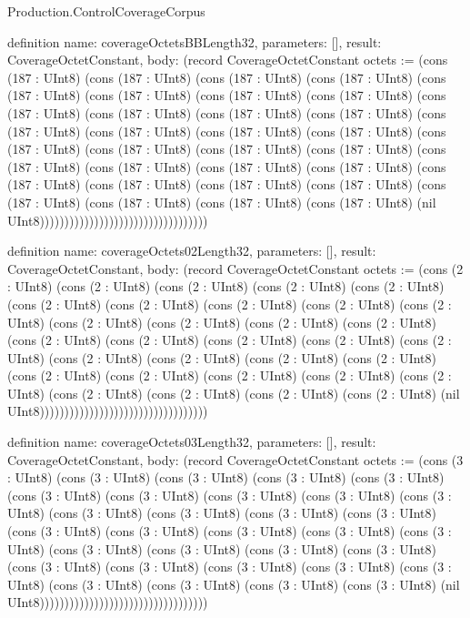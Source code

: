 \begin{lexlean}{Production.ControlCoverageCorpus}
\begin{semanticmodule}
definition{
  name: coverageOctetsBBLength32,
  parameters: [],
  result: CoverageOctetConstant,
  body: (record CoverageOctetConstant {octets := (cons (187 : UInt8) (cons (187 : UInt8) (cons (187 : UInt8) (cons (187 : UInt8) (cons (187 : UInt8) (cons (187 : UInt8) (cons (187 : UInt8) (cons (187 : UInt8) (cons (187 : UInt8) (cons (187 : UInt8) (cons (187 : UInt8) (cons (187 : UInt8) (cons (187 : UInt8) (cons (187 : UInt8) (cons (187 : UInt8) (cons (187 : UInt8) (cons (187 : UInt8) (cons (187 : UInt8) (cons (187 : UInt8) (cons (187 : UInt8) (cons (187 : UInt8) (cons (187 : UInt8) (cons (187 : UInt8) (cons (187 : UInt8) (cons (187 : UInt8) (cons (187 : UInt8) (cons (187 : UInt8) (cons (187 : UInt8) (cons (187 : UInt8) (cons (187 : UInt8) (cons (187 : UInt8) (cons (187 : UInt8) (nil UInt8)))))))))))))))))))))))))))))))))})
}

definition{
  name: coverageOctets02Length32,
  parameters: [],
  result: CoverageOctetConstant,
  body: (record CoverageOctetConstant {octets := (cons (2 : UInt8) (cons (2 : UInt8) (cons (2 : UInt8) (cons (2 : UInt8) (cons (2 : UInt8) (cons (2 : UInt8) (cons (2 : UInt8) (cons (2 : UInt8) (cons (2 : UInt8) (cons (2 : UInt8) (cons (2 : UInt8) (cons (2 : UInt8) (cons (2 : UInt8) (cons (2 : UInt8) (cons (2 : UInt8) (cons (2 : UInt8) (cons (2 : UInt8) (cons (2 : UInt8) (cons (2 : UInt8) (cons (2 : UInt8) (cons (2 : UInt8) (cons (2 : UInt8) (cons (2 : UInt8) (cons (2 : UInt8) (cons (2 : UInt8) (cons (2 : UInt8) (cons (2 : UInt8) (cons (2 : UInt8) (cons (2 : UInt8) (cons (2 : UInt8) (cons (2 : UInt8) (cons (2 : UInt8) (nil UInt8)))))))))))))))))))))))))))))))))})
}

definition{
  name: coverageOctets03Length32,
  parameters: [],
  result: CoverageOctetConstant,
  body: (record CoverageOctetConstant {octets := (cons (3 : UInt8) (cons (3 : UInt8) (cons (3 : UInt8) (cons (3 : UInt8) (cons (3 : UInt8) (cons (3 : UInt8) (cons (3 : UInt8) (cons (3 : UInt8) (cons (3 : UInt8) (cons (3 : UInt8) (cons (3 : UInt8) (cons (3 : UInt8) (cons (3 : UInt8) (cons (3 : UInt8) (cons (3 : UInt8) (cons (3 : UInt8) (cons (3 : UInt8) (cons (3 : UInt8) (cons (3 : UInt8) (cons (3 : UInt8) (cons (3 : UInt8) (cons (3 : UInt8) (cons (3 : UInt8) (cons (3 : UInt8) (cons (3 : UInt8) (cons (3 : UInt8) (cons (3 : UInt8) (cons (3 : UInt8) (cons (3 : UInt8) (cons (3 : UInt8) (cons (3 : UInt8) (cons (3 : UInt8) (nil UInt8)))))))))))))))))))))))))))))))))})
}


\end{semanticmodule}
\end{lexlean}
